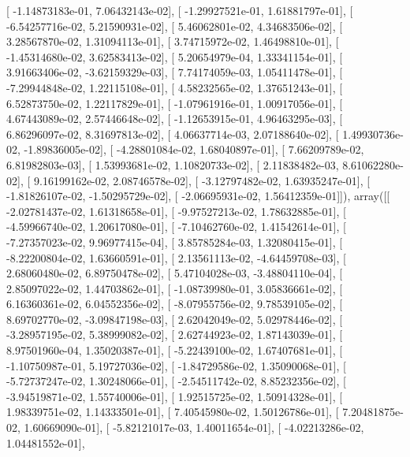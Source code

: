 \documentclass{article}
\begin{document}
       [ -1.14873183e-01,   7.06432143e-02],
       [ -1.29927521e-01,   1.61881797e-01],
       [ -6.54257716e-02,   5.21590931e-02],
       [  5.46062801e-02,   4.34683506e-02],
       [  3.28567870e-02,   1.31094113e-01],
       [  3.74715972e-02,   1.46498810e-01],
       [ -1.45314680e-02,   3.62583413e-02],
       [  5.20654979e-04,   1.33341154e-01],
       [  3.91663406e-02,  -3.62159329e-03],
       [  7.74174059e-03,   1.05411478e-01],
       [ -7.29944848e-02,   1.22115108e-01],
       [  4.58232565e-02,   1.37651243e-01],
       [  6.52873750e-02,   1.22117829e-01],
       [ -1.07961916e-01,   1.00917056e-01],
       [  4.67443089e-02,   2.57446648e-02],
       [ -1.12653915e-01,   4.96463295e-03],
       [  6.86296097e-02,   8.31697813e-02],
       [  4.06637714e-03,   2.07188640e-02],
       [  1.49930736e-02,  -1.89836005e-02],
       [ -4.28801084e-02,   1.68040897e-01],
       [  7.66209789e-02,   6.81982803e-03],
       [  1.53993681e-02,   1.10820733e-02],
       [  2.11838482e-03,   8.61062280e-02],
       [  9.16199162e-02,   2.08746578e-02],
       [ -3.12797482e-02,   1.63935247e-01],
       [ -1.81826107e-02,  -1.50295729e-02],
       [ -2.06695931e-02,   1.56412359e-01]]), array([[ -2.02781437e-02,   1.61318658e-01],
       [ -9.97527213e-02,   1.78632885e-01],
       [ -4.59966740e-02,   1.20617080e-01],
       [ -7.10462760e-02,   1.41542614e-01],
       [ -7.27357023e-02,   9.96977415e-04],
       [  3.85785284e-03,   1.32080415e-01],
       [ -8.22200804e-02,   1.63660591e-01],
       [  2.13561113e-02,  -4.64459708e-03],
       [  2.68060480e-02,   6.89750478e-02],
       [  5.47104028e-03,  -3.48804110e-04],
       [  2.85097022e-02,   1.44703862e-01],
       [ -1.08739980e-01,   3.05836661e-02],
       [  6.16360361e-02,   6.04552356e-02],
       [ -8.07955756e-02,   9.78539105e-02],
       [  8.69702770e-02,  -3.09847198e-03],
       [  2.62042049e-02,   5.02978446e-02],
       [ -3.28957195e-02,   5.38999082e-02],
       [  2.62744923e-02,   1.87143039e-01],
       [  8.97501960e-04,   1.35020387e-01],
       [ -5.22439100e-02,   1.67407681e-01],
       [ -1.10750987e-01,   5.19727036e-02],
       [ -1.84729586e-02,   1.35090068e-01],
       [ -5.72737247e-02,   1.30248066e-01],
       [ -2.54511742e-02,   8.85232356e-02],
       [ -3.94519871e-02,   1.55740006e-01],
       [  1.92515725e-02,   1.50914328e-01],
       [  1.98339751e-02,   1.14333501e-01],
       [  7.40545980e-02,   1.50126786e-01],
       [  7.20481875e-02,   1.60669090e-01],
       [ -5.82121017e-03,   1.40011654e-01],
       [ -4.02213286e-02,   1.04481552e-01],
\end{document}
